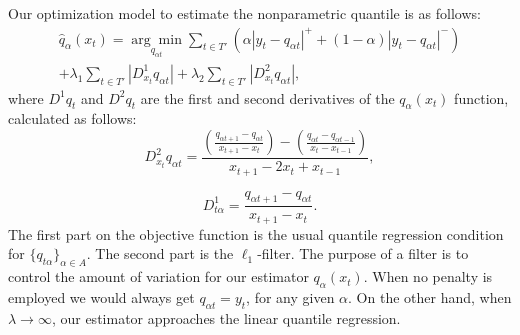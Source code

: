Our optimization model to estimate the nonparametric quantile is as follows:
\begin{equation}
\begin{split}
\hat{q}_\alpha(x_t) =\underset{q_{\alpha t}}{\arg\min}\sum_{t\in T'} \left( \alpha |y_{t}-q_{\alpha t}|^{+} + (1-\alpha)|y_{t}-q_{\alpha t}|^{-}\right) \\ +\lambda_1  \sum_{t\in T'}|D_{x_t}^{1}q_{\alpha t}| +\lambda_2  \sum_{t\in T'}|D_{x_t}^{2}q_{\alpha t}|,
\end{split}
\end{equation}
where $D^1 q_t$ and $D^2 q_t$ are the first and second derivatives of the $q_\alpha(x_t)$ function, calculated as follows:
\begin{equation*}
D_{x_{t}}^{2}q_{\alpha t}=\frac{\left(\frac{q_{\alpha t+1}-q_{\alpha t}}{x_{t+1}-x_{t}}\right)-\left(\frac{q_{\alpha t}-q_{\alpha t-1}}{x_{t}-x_{t-1}}\right)}{x_{t+1}-2x_{t} + x_{t-1}},
\end{equation*}


\begin{equation*}
D^{1}_{t \alpha }=\frac{q_{\alpha t+1}-q_{\alpha t}}{x_{t+1}-x_{t}}.
\end{equation*}
The first part on the objective function is the usual quantile regression condition for $\{q_{t\alpha}\}_{\alpha \in A}$. The second part is the $\ell_1$-filter. The purpose of a filter is to control the amount of variation for our estimator $q_\alpha(x_t)$. When no penalty is employed we would always get $q_{\alpha t} = y_t$, for any given $\alpha$. On the other hand, when $\lambda \rightarrow \infty$, our estimator approaches the linear quantile regression. 

